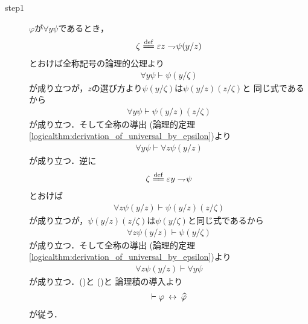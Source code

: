 	\begin{sketch}\mbox{}
		\begin{description}
			\item[step1]
				$\varphi$が$\forall y \psi$であるとき，
				\begin{align}
					\zeta \defeq \varepsilon z \negation \psi(y/z)
				\end{align}
				とおけば全称記号の論理的公理より
				\begin{align}
					\forall y \psi \vdash \psi(y/\zeta)
				\end{align}
				が成り立つが，$z$の選び方より$\psi(y/\zeta)$は$\psi(y/z)(z/\zeta)$と
				同じ式であるから
				\begin{align}
					\forall y \psi \vdash \psi(y/z)(z/\zeta)
				\end{align}
				が成り立つ．そして全称の導出
				(論理的定理\ref{logicalthm:derivation_of_universal_by_epsilon})より
				\begin{align}
					\forall y \psi \vdash \forall z \psi(y/z)
					\label{fom:equivalence_by_replacing_bound_variables_1}
				\end{align}
				が成り立つ．逆に
				\begin{align}
					\zeta \defeq \varepsilon y \negation \psi
				\end{align}
				とおけば
				\begin{align}
					\forall z \psi(y/z) \vdash \psi(y/z)(z/\zeta)
				\end{align}
				が成り立つが，$\psi(y/z)(z/\zeta)$は$\psi(y/\zeta)$と同じ式であるから
				\begin{align}
					\forall z \psi(y/z) \vdash \psi(y/\zeta)
				\end{align}
				が成り立つ．そして全称の導出
				(論理的定理\ref{logicalthm:derivation_of_universal_by_epsilon})より
				\begin{align}
					\forall z \psi(y/z) \vdash \forall y \psi
					\label{fom:equivalence_by_replacing_bound_variables_2}
				\end{align}
				が成り立つ．()と
				()と
				論理積の導入より
				\begin{align}
					\vdash \varphi \hspace{0.25em}\leftrightarrow\hspace{0.25em} \widehat{\varphi}
				\end{align}
				が従う．
			

\end{description}
\end{sketch}
